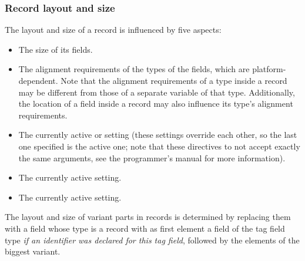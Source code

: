 \subsubsection{Record layout and size}

The layout and size of a record is influenced by five aspects:
\begin{itemize}
\item The size of its fields.
\item The alignment requirements of the types of the fields, which are
platform-dependent. Note that the alignment requirements of a type
inside a record may be different from those of a separate variable of
that type. Additionally, the location of a field inside a record may
also influence its type's alignment requirements.
\item The currently active  or  setting (these settings override each other, so the last one
specified is the active one; note that these directives to not accept
exactly the same arguments, see the programmer's manual for more
information).
\item The currently active  setting.
\item The currently active  setting.
\end{itemize}

The layout and size of variant parts in records is determined by
replacing them with a field whose type is a record with as first element
a field of the tag field type {\em if an identifier was declared for
this tag field}, followed by the elements of the biggest variant.


